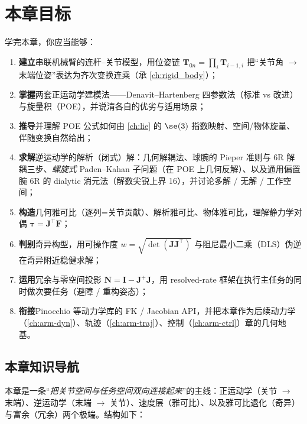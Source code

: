 \section*{本章目标}
学完本章，你应当能够：
\begin{enumerate}
  \item \textbf{建立}串联机械臂的连杆--关节模型，用位姿链 $\mathbf{T}_{0n}=\prod_i\mathbf{T}_{i-1,i}$ 把“关节角 $\to$ 末端位姿”表达为齐次变换连乘（承 \cref{ch:rigid_body}）；
  \item \textbf{掌握}两套正运动学建模法——Denavit--Hartenberg 四参数法（标准 vs 改进）与旋量积（POE），并说清各自的优劣与适用场景；
  \item \textbf{推导}并理解 POE 公式如何由 \cref{ch:lie} 的 $\se(3)$ 指数映射、空间/物体旋量、伴随变换自然给出；
  \item \textbf{求解}逆运动学的解析（闭式）解：几何解耦法、球腕的 Pieper 准则与 6R 解耦三步、\emph{螺旋式} Paden--Kahan 子问题（在 POE 上几何反解）、以及通用偏置腕 6R 的 dialytic 消元法（解数尖锐上界 16），并讨论多解 / 无解 / 工作空间；
  \item \textbf{构造}几何雅可比（逐列=关节贡献）、解析雅可比、物体雅可比，理解静力学对偶 $\boldsymbol{\tau}=\mathbf{J}^\top\mathbf{F}$；
  \item \textbf{判别}奇异构型，用可操作度 $w=\sqrt{\det(\mathbf{J}\mathbf{J}^\top)}$ 与阻尼最小二乘（DLS）伪逆在奇异附近稳健求解；
  \item \textbf{运用}冗余与零空间投影 $\mathbf{N}=\mathbf{I}-\mathbf{J}^{+}\mathbf{J}$，用 resolved-rate 框架在执行主任务的同时做次要任务（避障 / 重构姿态）；
  \item \textbf{衔接}Pinocchio 等动力学库的 FK / Jacobian API，并把本章作为后续动力学（\cref{ch:arm-dyn}）、轨迹（\cref{ch:arm-traj}）、控制（\cref{ch:arm-ctrl}）章的几何地基。
\end{enumerate}

\subsection*{本章知识导航}
本章是一条“\emph{把关节空间与任务空间双向连接起来}”的主线：正运动学（关节 $\to$ 末端）、逆运动学（末端 $\to$ 关节）、速度层（雅可比）、以及雅可比退化（奇异）与富余（冗余）两个极端。结构如下：

